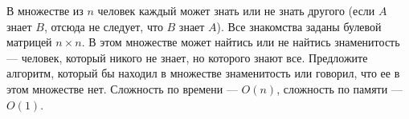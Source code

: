 \documentclass{article}
\begin{document}
В множестве из $n$ человек каждый может знать или не знать другого (если $A$ знает $B$, отсюда не следует, что $B$ знает $A$). 
Все знакомства заданы булевой матрицей $n\times n$. В этом множестве может найтись или не найтись знаменитость --- человек, который никого не знает, но которого знают все. 
Предложите алгоритм, который бы находил в множестве знаменитость или говорил, что ее в этом множестве нет. Сложность по времени --- $O(n)$, сложность по памяти --- $O(1)$.
\end{document}

